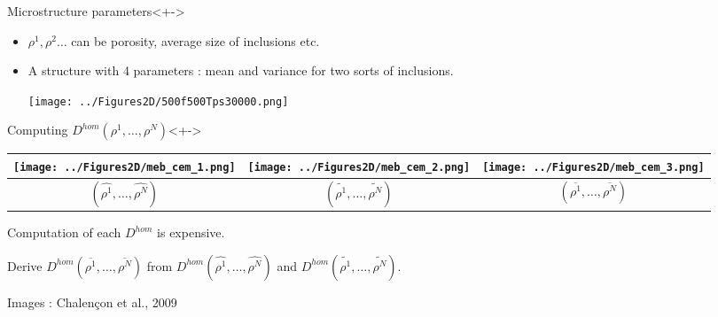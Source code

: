 \begin{frame}%
%
\begin{block}{Microstructure parameters}<+->
%
\begin{itemize}
\item<+-> $\rho^1, \rho^2 \dots$ can be porosity, average size of inclusions etc.
\item<+-> %
\vspace{-0.5cm}
\begin{multicols}{2}
A structure with 4 parameters : mean and variance for two sorts of inclusions.

\columnbreak
\texttt{[image: ../Figures2D/500f500Tps30000.png]}
\end{multicols}
%
\end{itemize}
%
\end{block}
%
\begin{block}{Computing $D^{hom}(\rho^1,\dots ,\rho^N)$}<+->
%
\begin{tabular}{|c|c|c|}
\hline
\texttt{[image: ../Figures2D/meb\_cem\_1.png]}&%
\texttt{[image: ../Figures2D/meb\_cem\_2.png]}&%
\texttt{[image: ../Figures2D/meb\_cem\_3.png]}%
\\
\hline
$(\hat{\rho^1},\dots ,\hat{\rho^N})$&%
$(\tilde{\rho^1},\dots ,\tilde{\rho^N})$&%
$(\overline{\rho^1},\dots ,\overline{\rho^N})$%
\\
\hline
\end{tabular}

\begin{description}
\item<+-> [Issue] Computation of each $D^{hom}$ is expensive.
\item<+-> [Solution] Derive $D^{hom}(\overline{\rho^1},\dots ,\overline{\rho^N})$ from %
$D^{hom}(\hat{\rho^1},\dots ,\hat{\rho^N})$ and $D^{hom}(\tilde{\rho^1},\dots ,\tilde{\rho^N})$.
\end{description}
%
\par
Images : Chalen\c con et al., 2009
\end{block}
%
\end{frame}